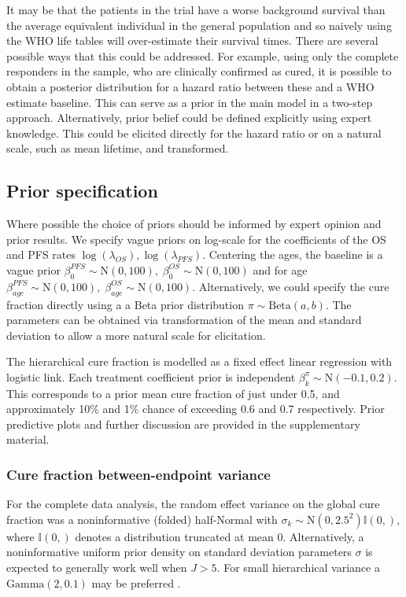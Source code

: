 \documentclass[AMA,STIX1COL]{WileyNJD-v2}
\begin{document}
It may be that the patients in the trial have a worse background survival than the average equivalent individual in the general population and so naively using the WHO life tables will over-estimate their survival times.
There are several possible ways that this could be addressed.
For example, using only the complete responders in the sample, who are clinically confirmed as cured, it is possible to obtain a posterior distribution for a hazard ratio between these and a WHO estimate baseline.
This can serve as a prior in the main model in a two-step approach. Alternatively, prior belief could be defined explicitly using expert knowledge.
This could be elicited directly for the hazard ratio or on a natural scale, such as mean lifetime, and transformed.

%
\subsection{Prior specification}
Where possible the choice of priors should be informed by expert opinion and prior results.
We specify vague priors on log-scale for the coefficients of the OS and PFS rates $\log(\lambda_{OS}),  \log(\lambda_{PFS})$.
Centering the ages, the baseline is a vague prior ${\beta_0^{PFS} \sim \text{N}(0, 100),}\; {\beta_0^{OS} \sim \text{N}(0, 100)}$
and for age $\beta_{age}^{PFS} \sim \text{N}(0, 100),\; \beta_{age}^{OS} \sim \text{N}(0, 100)$.
Alternatively, we could specify the cure fraction directly using a a Beta prior distribution $\pi \sim \text{Beta}(a, b)$.
The parameters can be obtained via transformation of the mean and standard deviation to allow a more natural scale for elicitation.

The hierarchical cure fraction is modelled as a fixed effect linear regression with logistic link. Each treatment coefficient prior is independent $\beta^{\pi}_k \sim \text{N}(-0.1, 0.2)$.
This corresponds to a prior mean cure fraction of just under 0.5, and approximately 10\% and 1\% chance of exceeding 0.6 and 0.7 respectively.
Prior predictive plots and further discussion are provided in the supplementary material.

\subsubsection{Cure fraction between-endpoint variance}
For the complete data analysis, the random effect variance on the global cure fraction was a noninformative (folded) half-Normal \cite{Gelman2006} with 
${\sigma_k \sim \text{N}(0, 2.5^2)\mathbb{I}(0,)}$, where $\mathbb{I}(0,)$ denotes a distribution truncated at mean 0.
Alternatively, a noninformative uniform prior density on standard deviation parameters $\sigma$ is expected to generally work well when $J > 5$.
For small hierarchical variance a $\text{Gamma}(2, 0.1)$ may be preferred \cite{Chung2013}.
\end{document}
